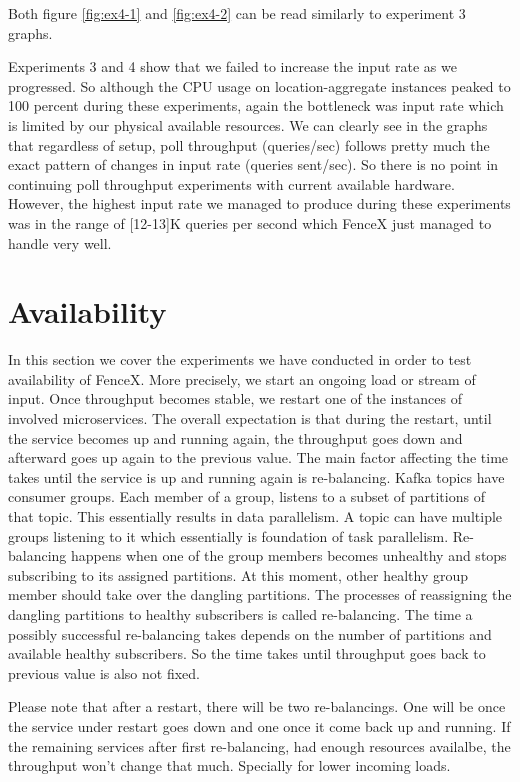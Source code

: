 \documentclass[a4]{report}
\begin{document}
    Both figure \ref{fig:ex4-1} and \ref{fig:ex4-2} can be read similarly to experiment 3 graphs.

    Experiments 3 and 4 show that we failed to increase the input rate as we progressed.
    So although the CPU usage on location-aggregate instances peaked to 100 percent during these experiments,
    again the bottleneck was input rate which is limited by our physical available resources.
    We can clearly see in the graphs that regardless of setup, poll throughput (queries/sec) follows pretty
    much the exact pattern of changes in input rate (queries sent/sec).
    So there is no point in continuing poll throughput experiments with current available hardware.
    However, the highest input rate we managed to produce during these experiments was in the range of [12-13]K queries
    per second which FenceX just managed to handle very well.


    \section{Availability}
    In this section we cover the experiments we have conducted in order to test availability of FenceX.
    More precisely, we start an ongoing load or stream of input.
    Once throughput becomes stable, we restart one of the instances of involved microservices.
    The overall expectation is that during the restart, until the service becomes up and running again, the throughput
    goes down and afterward goes up again to the previous value.
    The main factor affecting the time takes until the service is up and running again is re-balancing.
    Kafka topics have consumer groups.
    Each member of a group, listens to a subset of partitions of that topic.
    This essentially results in data parallelism.
    A topic can have multiple groups listening to it which essentially is foundation of task parallelism.
    Re-balancing happens when one of the group members becomes unhealthy and stops subscribing to its assigned
    partitions.
    At this moment, other healthy group member should take over the dangling partitions.
    The processes of reassigning the dangling partitions to healthy subscribers is called re-balancing.
    The time a possibly successful re-balancing takes depends on the number of partitions and available
    healthy subscribers.
    So the time takes until throughput goes back to previous value is also not fixed.

    Please note that after a restart, there will be two re-balancings.
    One will be once the service under restart goes down and one once it come back up and running.
    If the remaining services after first re-balancing, had enough resources availalbe, the throughput won't change
    that much.
    Specially for lower incoming loads.
\end{document}
